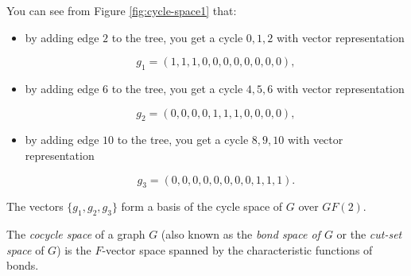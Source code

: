 \begin{example}
{You can see from Figure \ref{fig:cycle-space1} that:

\begin{itemize}
\item
by adding edge $2$ to the tree, you get a cycle $0,1,2$ with vector
representation

\[
g_1 = (1,1,1,0,0,0,0,0,0,0,0),
\]
\item
by adding edge $6$ to the tree, you get a cycle $4,5,6$ with vector
representation

\[
g_2 = (0,0,0,0,1,1,1,0,0,0,0),
\]
\item
by adding edge $10$ to the tree, you get a cycle $8,9,10$ with vector
representation

\[
g_3 = (0,0,0,0,0,0,0,0,1,1,1).
\]
\end{itemize}
The vectors $\{g_1,g_2,g_3\}$ form a basis of the cycle space 
of $G$ over $GF(2)$.
}
\end{example}

The {\it cocycle space} of a graph $G$ (also known as 
the {\it bond space of $G$} or the {\it cut-set space} of $G$)
is the $F$-vector space spanned by the characteristic
functions of bonds. 


